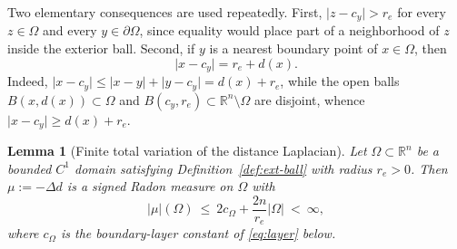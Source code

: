 \documentclass[11pt]{article}
\newcommand{\R}{\mathbb R}
\newcommand{\abs}[1]{\lvert #1\rvert}
\newtheorem{lemma}[theorem]{Lemma}
\theoremstyle{definition}
\theoremstyle{remark}
\begin{document}
Two elementary consequences are used repeatedly. First,
$\abs{z-c_y}>r_e$ for every $z\in\Omega$ and every $y\in\partial\Omega$, since
equality would place part of a neighborhood of $z$ inside the exterior ball.
Second, if $y$ is a nearest boundary point of $x\in\Omega$, then
\begin{equation}\label{eq:tangency}
\abs{x-c_y}=r_e+d(x).
\end{equation}
Indeed, $\abs{x-c_y}\le\abs{x-y}+\abs{y-c_y}=d(x)+r_e$, while the open balls
$B(x,d(x))\subset\Omega$ and $B(c_y,r_e)\subset\R^n\setminus\Omega$ are
disjoint, whence $\abs{x-c_y}\ge d(x)+r_e$.

 
\begin{lemma}[Finite total variation of the distance Laplacian]\label{lem:tv-exterior-ball}
Let $\Omega\subset\R^n$ be a bounded $C^1$ domain satisfying
Definition~\ref{def:ext-ball} with radius $r_e>0$. Then $\mu:=-\Delta d$ is a
signed Radon measure on $\Omega$ with
\[
\abs{\mu}(\Omega)\ \le\ 2c_\Omega+\frac{2n}{r_e}\abs{\Omega}\ <\ \infty,
\]
where $c_\Omega$ is the boundary-layer constant of \eqref{eq:layer} below.
\end{lemma}
\end{document}
